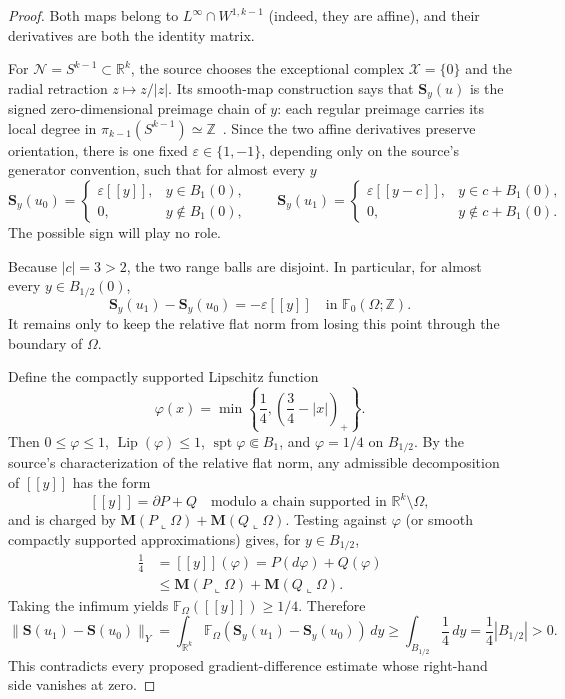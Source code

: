 \documentclass[11pt]{article}
\newcommand{\R}{\mathbb R}
\newcommand{\Z}{\mathbb Z}
\newcommand{\Sop}{\mathbf S}
\newcommand{\pointchain}[1]{[\![#1]\!]}
\begin{document}
\begin{proof}
Both maps belong to $L^\infty\cap W^{1,k-1}$ (indeed, they are affine), and
their derivatives are both the identity matrix.

For $\mathcal N=S^{k-1}\subset\R^k$, the source chooses the exceptional
complex $\mathcal X=\{0\}$ and the radial retraction
$z\mapsto z/|z|$.  Its smooth-map construction says that
$\Sop_y(u)$ is the signed zero-dimensional preimage chain of $y$: each
regular preimage carries its local degree in
$\pi_{k-1}(S^{k-1})\simeq\Z$~\cite[Sections 1.2 and 3.2]{CO}.  Since the
two affine derivatives preserve orientation, there is one fixed
$\varepsilon\in\{1,-1\}$, depending only on the source's generator
convention, such that for almost every $y$
\[
 \Sop_y(u_0)=
 \begin{cases}
  \varepsilon\pointchain{y},&y\in B_1(0),\\
  0,&y\notin B_1(0),
 \end{cases}
 \qquad
 \Sop_y(u_1)=
 \begin{cases}
  \varepsilon\pointchain{y-c},&y\in c+B_1(0),\\
  0,&y\notin c+B_1(0).
 \end{cases}
\]
The possible sign will play no role.

Because $|c|=3>2$, the two range balls are disjoint.  In particular, for
almost every $y\in B_{1/2}(0)$,
\[
 \Sop_y(u_1)-\Sop_y(u_0)
 =-\varepsilon\pointchain{y}
 \quad\text{in }\mathbb F_0(\Omega;\Z).
\]
It remains only to keep the relative flat norm from losing this point
through the boundary of $\Omega$.

Define the compactly supported Lipschitz function
\[
 \varphi(x)=\min\!\left\{\frac14,
                  \left(\frac34-|x|\right)_+\right\}.
\]
Then $0\le\varphi\le1$, $\operatorname{Lip}(\varphi)\le1$,
$\operatorname{spt}\varphi\Subset B_1$, and
$\varphi=1/4$ on $B_{1/2}$.  By the source's characterization of the
relative flat norm, any admissible decomposition of
$\pointchain{y}$ has the form
\[
   \pointchain{y}=\partial P+Q
 \quad\text{modulo a chain supported in }\R^k\setminus\Omega,
\]
and is charged by
$\mathbf M(P\mathbin{\llcorner}\Omega)
 +\mathbf M(Q\mathbin{\llcorner}\Omega)$.
Testing against $\varphi$ (or smooth compactly supported approximations)
gives, for $y\in B_{1/2}$,
\begin{align*}
 \frac14
 &=\pointchain{y}(\varphi)
   =P(d\varphi)+Q(\varphi)\\
 &\le
 \mathbf M(P\mathbin{\llcorner}\Omega)
 +\mathbf M(Q\mathbin{\llcorner}\Omega).
\end{align*}
Taking the infimum yields
$\mathbb F_\Omega(\pointchain{y})\ge1/4$.  Therefore
\[
 \|\Sop(u_1)-\Sop(u_0)\|_Y
 =\int_{\R^k}\mathbb F_\Omega
   (\Sop_y(u_1)-\Sop_y(u_0))\,dy
 \ge\int_{B_{1/2}}\frac14\,dy
 =\frac14|B_{1/2}|>0.
\]
This contradicts every proposed gradient-difference estimate whose
right-hand side vanishes at zero.
\end{proof}
\end{document}
